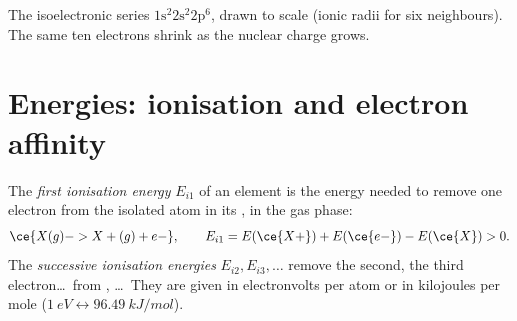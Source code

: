 \begin{omfigure}

{\small The isoelectronic series $1\text{s}^2 2\text{s}^2 2\text{p}^6$,
drawn to scale (ionic radii for six neighbours). The same ten electrons
shrink as the nuclear charge grows.}
\end{omfigure}

\section{Energies: ionisation and electron affinity}

\begin{definition}\label{def:b1:periodicity:ionisation-energy}
The \emph{first ionisation energy} $E_{i1}$
of an element is the energy needed to remove one electron from the
isolated atom in its , in the gas phase:
\[
  \ce{X(g) -> X+(g) + e-}, \qquad E_{i1} = E(\ce{X+}) + E(\ce{e-}) - E(\ce{X}) > 0 .
\]
The \emph{successive ionisation energies} $E_{i2}, E_{i3}, \dots$ remove the second, the third
electron\dots\ from , \dots\ They are given in
electronvolts per atom or in kilojoules per mole
($\qty{1}{eV} \leftrightarrow \qty{96.49}{kJ/mol}$).
\end{definition}

